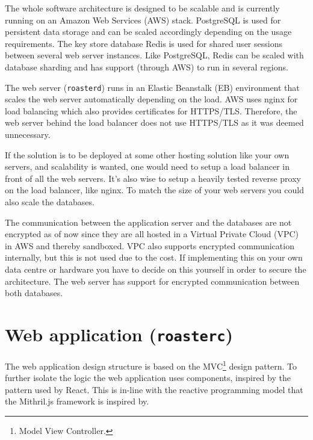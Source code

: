 \documentclass[12pt,a4paper]{report}
\begin{document}
The whole software architecture is designed to be scalable and is currently running on an Amazon Web Services (AWS) stack. PostgreSQL is used for persistent data storage and can be scaled accordingly depending on the usage requirements. The key store database Redis is used for shared user sessions between several web server instances. Like PostgreSQL, Redis can be scaled with database sharding and has support (through AWS) to run in several regions.

The web server (\texttt{roasterd}) runs in an Elastic Beanstalk (EB) environment that scales the web server automatically depending on the load. AWS uses nginx for load balancing which also provides certificates for HTTPS/TLS. Therefore, the web server behind the load balancer does not use HTTPS/TLS as it was deemed unnecessary.

If the solution is to be deployed at some other hosting solution like your own servers, and scalability is wanted, one would need to setup a load balancer in front of all the web servers. It's also wise to setup a heavily tested reverse proxy on the load balancer, like nginx. To match the size of your web servers you could also scale the databases.

The communication between the application server and the databases are not encrypted as of now since they are all hosted in a Virtual Private Cloud (VPC) in AWS and thereby sandboxed. VPC also supports encrypted communication internally, but this is not used due to the cost. If implementing this on your own data centre or hardware you have to decide on this yourself in order to secure the architecture. The web server has  support for encrypted communication between both databases.

\section{Web application (\texttt{roasterc})}
The web application design structure is based on the MVC\footnote{Model View Controller.} design pattern. To further isolate the logic the web application uses components, inspired by the pattern used by React\cite{react-component}. This is in-line with the reactive programming model that the Mithril.js framework is inspired by.
\end{document}
